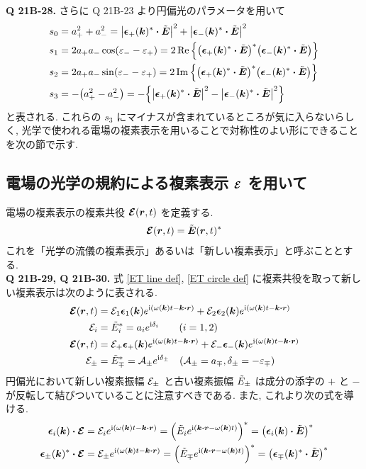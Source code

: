 \documentclass[a4paper,dvipdfmx]{jsarticle}
\theoremstyle{definition}
\begin{document}
\textbf{Q 21B-28.}
さらに Q 21B-23 より円偏光のパラメータを用いて
\begin{align}
  s_0 & = a_+^2 + a_-^2 = \qty|\ee_+(\kk)^*\vdot\ET|^2 + \qty|\ee_-(\kk)^*\vdot\ET|^2                                   \\
  s_1 & = 2a_+a_-\cos(\varepsilon_- - \varepsilon_+) = 2\Re\qty{\qty(\ee_+(\kk)^*\vdot\ET)^*\qty(\ee_-(\kk)^*\vdot\ET)} \\
  s_2 & = 2a_+a_-\sin(\varepsilon_- - \varepsilon_+) = 2\Im\qty{\qty(\ee_+(\kk)^*\vdot\ET)^*\qty(\ee_-(\kk)^*\vdot\ET)} \\
  s_3 & = -\qty(a_+^2 - a_-^2) = -\qty{\qty|\ee_+(\kk)^*\vdot\ET|^2 - \qty|\ee_-(\kk)^*\vdot\ET|^2}
\end{align}
と表される. これらの $s_3$ にマイナスが含まれているところが気に入らないらしく, 光学で使われる電場の複素表示を用いることで対称性のよい形にできることを次の節で示す. \\

\subsection{電場の光学の規約による複素表示 $\vb*{\mathcal{E}}$ を用いて}
電場の複素表示の複素共役 $\vb*{\mathcal{E}}(\vb*{r}, t)$ を定義する.
\begin{align}
  \vb*{\mathcal{E}}(\vb*{r}, t) = \tilde{\vb*{E}}(\vb*{r}, t)^*
\end{align}
これを「光学の流儀の複素表示」あるいは「新しい複素表示」と呼ぶこととする. \\

\textbf{Q 21B-29, Q 21B-30.}
式 \eqref{ET line def}, \eqref{ET circle def} に複素共役を取って新しい複素表示は次のように表される.
\begin{align}
  \EC(\rr, t) & = \Ec_1\ee_1(\kk)e^{\ii(\omega(\kk)t - \kk\vdot\rr)} + \Ec_2\ee_2(\kk)e^{\ii(\omega(\kk)t - \kk\vdot\rr)}      \\
  \Ec_i       & = \Et_i^* = a_ie^{\ii\delta_i} \qquad (i = 1, 2)                                                               \\
  \EC(\rr, t) & = \Ec_+\ee_+(\kk)e^{\ii(\omega(\kk)t - \kk\vdot\rr)} + \Ec_-\ee_-(\kk)e^{\ii(\omega(\kk)t - \kk\vdot\rr)}      \\
  \Ec_\pm     & = \Et_\mp^* = \mathcal{A}_\pm e^{\ii\delta_\pm} \quad (\mathcal{A}_\pm = a_\mp, \delta_\pm = -\varepsilon_\mp)
\end{align}
円偏光において新しい複素振幅 $\mathcal{E}_\pm$ と古い複素振幅 $\tilde{E}_\pm$ は成分の添字の $+$ と $-$ が反転して結びついていることに注意すべきである. また, これより次の式を導ける.
\begin{align}
  \ee_i(\kk)\vdot\EC
   & = \Ec_ie^{\ii(\omega(\kk)t - \kk\vdot\rr)} = \qty(\Et_i e^{\ii(\kk\vdot\rr - \omega(\kk)t)})^* = \qty(\ee_i(\kk)\vdot\ET)^* \label{EC ET converter 12}          \\
  \ee_\pm(\kk)^*\vdot\EC
   & = \Ec_\pm e^{\ii(\omega(\kk)t - \kk\vdot\rr)} = \qty(\Et_\mp e^{\ii(\kk\vdot\rr - \omega(\kk)t)})^* = \qty(\ee_\mp(\kk)^*\vdot\ET)^* \label{EC ET converter +-}
\end{align}
\\
\end{document}
